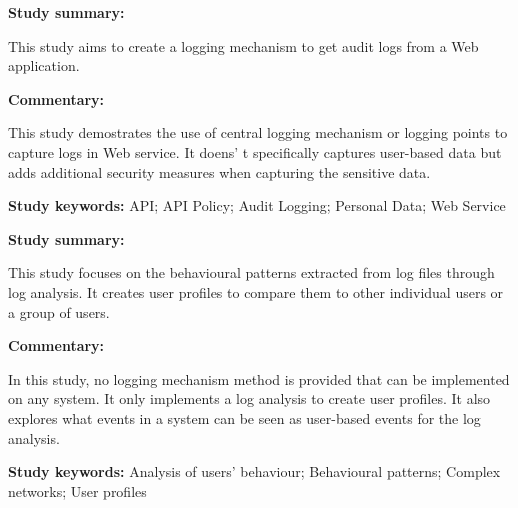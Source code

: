 \begin{tcolorbox}[colback=gray!5!white, colframe=deepblue!80!black, title=Central Audit Logging Mechanism in Personal Data Web Services\cite{Hasiloglu2018}]
	\begin{minipage}[t]{0.25\textwidth}
		\textbf{Study summary:}
	\end{minipage}
	\hfill
	\begin{minipage}[t]{0.65\textwidth}
		This study aims to create a logging mechanism to get audit logs from a Web application.
	\end{minipage}

	\vspace{0.75em} 

	\begin{minipage}[t]{0.25\textwidth}
		\textbf{Commentary:}
	\end{minipage}
	\hfill
	\begin{minipage}[t]{0.65\textwidth}
		This study demostrates the use of central logging mechanism or logging points to capture logs in Web service. It doens' t specifically captures user-based data but adds additional security measures when capturing the sensitive data. 
	\end{minipage}
	\tcblower
	\textbf{Study keywords:} API; API Policy; Audit Logging; Personal Data; Web Service
\end{tcolorbox}

\begin{tcolorbox}[colback=gray!5!white, colframe=deepblue!80!black, title=User behavioural patterns and reduced user profiles extracted from log files\cite{Slaninova2014}]
	\begin{minipage}[t]{0.25\textwidth}
		\textbf{Study summary:}
	\end{minipage}
	\hfill
	\begin{minipage}[t]{0.65\textwidth}
		This study focuses on the behavioural patterns extracted from log files through log analysis. It creates user profiles to compare them to other individual users or a group of users.
	\end{minipage}

	\vspace{0.75em} 

	\begin{minipage}[t]{0.25\textwidth}
		\textbf{Commentary:}
	\end{minipage}
	\hfill
	\begin{minipage}[t]{0.65\textwidth}
		In this study, no logging mechanism method is provided that can be implemented on any system. It only implements a log analysis to create user profiles. It also explores what events in a system can be seen as user-based events for the log analysis.
	\end{minipage}
	\tcblower
	\textbf{Study keywords:} Analysis of users' behaviour; Behavioural patterns; Complex networks; User profiles
\end{tcolorbox}

